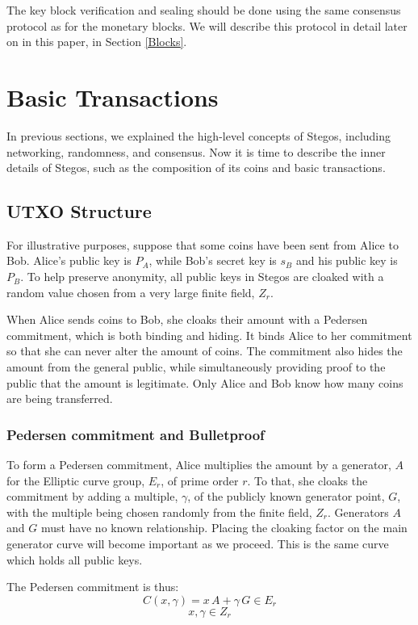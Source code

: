\documentclass[a4paper, 10pt, conference]{ieeeconf}
\begin{document}
The key block verification and sealing should be done using the same consensus protocol as for the monetary blocks. We will describe this protocol in detail later on in this paper, in Section \ref{Blocks}.

\section{Basic Transactions}\label{TransactionsAppendix}

In previous sections, we explained the high-level concepts of Stegos, including networking, randomness, and consensus. Now it is time to describe the inner details of Stegos, such as the composition of its coins and basic transactions.

\subsection{UTXO Structure}\label{UTXO}

For illustrative purposes, suppose that some coins have been sent from Alice to Bob. Alice's public key is $P_A$, while Bob's secret key is $s_B$ and his public key is $P_B$. To help preserve anonymity, all public keys in Stegos are cloaked with a random value chosen from a very large finite field, $Z_r$.

When Alice sends coins to Bob, she cloaks their amount with a Pedersen commitment, which is both binding and hiding. It binds Alice to her commitment so that she can never alter the amount of coins. The commitment also hides the amount from the general public, while simultaneously providing proof to the public that the amount is legitimate. Only Alice and Bob know how many coins are being transferred. 

\subsubsection{Pedersen commitment and Bulletproof} To form a Pedersen commitment, Alice multiplies the amount by a generator, $A$ for the Elliptic curve group, $E_r$, of prime order $r$. To that, she cloaks the commitment by adding a multiple, $\gamma$, of the publicly known generator point, $G$, with the multiple being chosen randomly from the finite field, $Z_r$. Generators $A$ and $G$ must have no known relationship. Placing the cloaking factor on the main generator curve will become important as we proceed. This is the same curve which holds all public keys. 

The Pedersen commitment is thus:
$$ C(x, \gamma) = x \, A + \gamma \, G \in E_r$$
$$x, \gamma \in Z_r$$
\end{document}
